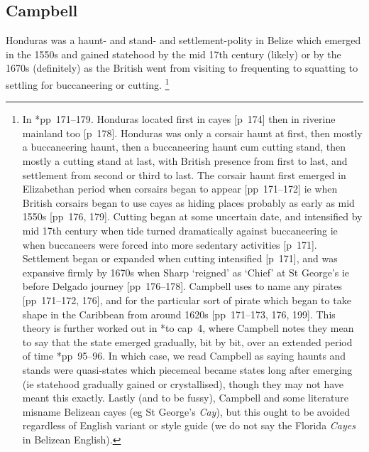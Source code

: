 	\subsection{Campbell}
	\label{ss:campbell}
		Honduras was a haunt- and stand- and settlement-polity in Belize which emerged in the 1550s and gained statehood by the mid 17th century (likely) or by the 1670s (definitely) as the British went from visiting to frequenting to squatting to settling for buccaneering or cutting.%
		\footnote{In \cite{cam03}*{pp~171--179}. Honduras located first in cayes [p~174] then in riverine mainland too [p~178]. Honduras was only a corsair haunt at first, then mostly a buccaneering haunt, then a buccaneering haunt cum cutting stand, then mostly a cutting stand at last, with British presence from first to last, and settlement from second or third to last. The corsair haunt first emerged in Elizabethan period when corsairs began to appear [pp~171--172] ie when British corsairs began to use cayes as hiding places probably as early as mid 1550s [pp~176, 179]. Cutting began at some uncertain date, and intensified by mid 17th century when tide turned dramatically against buccaneering ie when buccaneers were forced into more sedentary activities [p~171]. Settlement began or expanded when cutting intensified [p~171], and was expansive firmly by 1670s when Sharp `reigned' as `Chief' at St George's ie before Delgado journey [pp~176--178]. Campbell uses  to name any pirates [pp~171--172, 176], and  for the particular sort of pirate which began to take shape in the Caribbean from around 1620s [pp~171--173, 176, 199]. This theory is further worked out in \cite{cam11}*{to cap~4}, where Campbell notes they mean to say that the state emerged gradually, bit by bit, over an extended period of time \cite{cam11}*{pp~95--96}. In which case, we read Campbell as saying haunts and stands were quasi-states which piecemeal became states long after emerging (ie statehood gradually gained or crystallised), though they may not have meant this exactly. Lastly (and to be fussy), Campbell and some literature misname Belizean cayes (eg St George's \emph{Cay}), but this ought to be avoided regardless of English variant or style guide (we do not say the Florida \emph{Cayes} in Belizean English).} %
